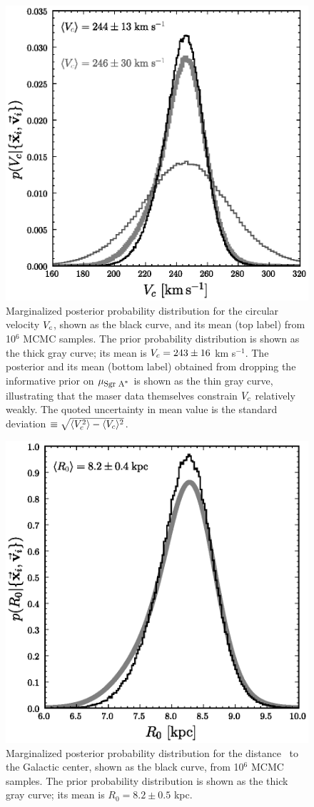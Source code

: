 \clearpage
\begin{figure}
\includegraphics[width=.46\textwidth]{figs_masers/thetao_1M.eps}
\caption[Marginalized posterior probability distribution for the
  circular velocity]{Marginalized posterior probability distribution
  for the circular velocity $V_c$, shown as the black curve, and its
  mean (top label) from 10$^6$ MCMC samples. The prior probability
  distribution is shown as the thick gray curve; its mean is $V_c =
  243 \pm 16 $ km s$^{-1}$. The posterior and its mean (bottom label)
  obtained from dropping the informative prior on $\mu_{\mbox{{\footnotesize Sgr A$^*$}}}$ is shown
  as the thin gray curve, illustrating that the maser data themselves
  constrain $V_c$ relatively weakly. The quoted uncertainty in mean
  value is the standard deviation $\equiv \sqrt{\langle V_c^2\rangle -
    \langle V_c\rangle^2}$.}\label{fig:thetao}
\end{figure}

\clearpage
\begin{figure}
\includegraphics[width=.46\textwidth]{figs_masers/ro_1M.eps}
\caption[Marginalized posterior probability distribution for the
  distance to the Galactic center]{Marginalized posterior probability
  distribution for the distance \Ro\ to the Galactic center, shown as
  the black curve, from 10$^6$ MCMC samples. The prior probability
  distribution is shown as the thick gray curve; its mean is $R_0 =
  8.2 \pm 0.5$ kpc.}\label{fig:ro}
\end{figure}



